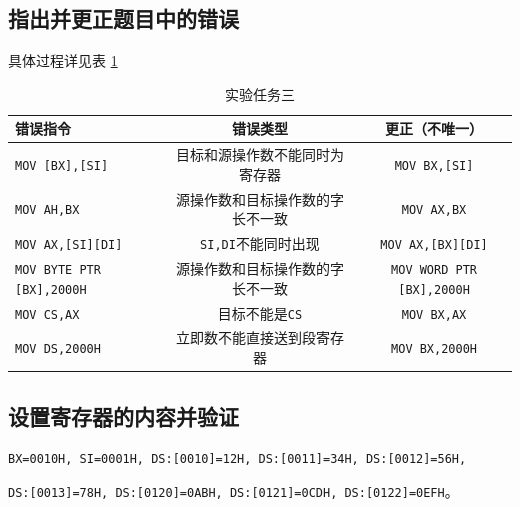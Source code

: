 \documentclass[11pt]{SEU-Digital-Report}
\newcommand{\grayrow}{\rowcolor[rgb]{ .906, .902, .902}}
\begin{document}
\subsection{指出并更正题目中的错误}
具体过程详见表 \ref{tab:task3}
\begin{table}[htbp]
    \centering
    \caption{实验任务三\label{tab:task3}}
    \bgroup{}
    \setlength{\tabcolsep}{3mm}
        \begin{tabular}{l|c|c}
          \toprule
            \textbf{错误指令} & \textbf{错误类型} & \textbf{更正（不唯一）}\\
            \midrule\midrule
            \grayrow \texttt{MOV [BX],[SI]} & 目标和源操作数不能同时为寄存器 & \texttt{MOV BX,[SI]}\\
            \texttt{MOV AH,BX} & 源操作数和目标操作数的字长不一致 &  \texttt{MOV AX,BX}\\
            \grayrow \texttt{MOV AX,[SI][DI]} & \texttt{SI,DI}不能同时出现 & \texttt{MOV AX,[BX][DI]} \\
            \texttt{MOV BYTE PTR [BX],2000H} & 源操作数和目标操作数的字长不一致 & \texttt{MOV WORD PTR [BX],2000H} \\
            \grayrow \texttt{MOV CS,AX} & 目标不能是\texttt{CS} & \texttt{MOV BX,AX}\\
            \texttt{MOV DS,2000H} & 立即数不能直接送到段寄存器 & \texttt{MOV BX,2000H}\\
          \bottomrule
        \end{tabular}
    \egroup
\end{table}

\subsection{设置寄存器的内容并验证}
\texttt{BX=0010H, SI=0001H, DS:[0010]=12H, DS:[0011]=34H, DS:[0012]=56H,} 

\texttt{DS:[0013]=78H, DS:[0120]=0ABH, DS:[0121]=0CDH, DS:[0122]=0EFH}。
\end{document}
